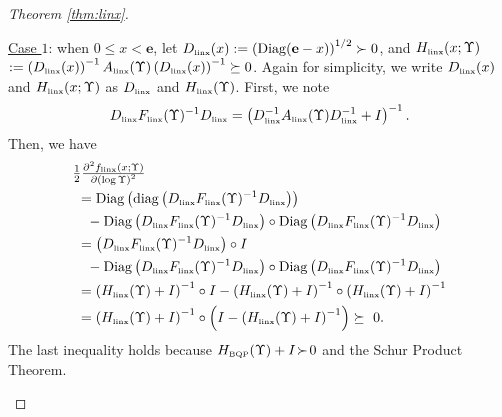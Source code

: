 \documentclass[smallextended]{svjour3hack}       %
\DeclareMathOperator{\Diag}{Diag}
\DeclareMathOperator{\diag}{diag}
\begin{document}
\begin{proof}[Theorem \ref{thm:linx}]
\begin{itemize}
    \smallskip
    \underline{Case $1$}: when $0\le x<\mathbf{e}$,  let $D_{{\tiny\mbox{linx}}}(x):=\left(\Diag(\mathbf{e}-x)\right)^{1/2} \succ 0$, and  $H_{{\tiny\mbox{linx}}}(x;\Upsilon)$ $:=\left(D_{{\tiny\mbox{linx}}}(x)\right)^{-1} A_{{\tiny\mbox{linx}}}(\Upsilon) \left(D_{{\tiny\mbox{linx}}}(x)\right)^{-1}\succeq 0$. Again for simplicity, we write $D_{{\tiny\mbox{linx}}}(x)$ and $H_{{\tiny\mbox{linx}}}(x;\Upsilon)$ as $D_{{\tiny\mbox{linx}}}$ and $H_{{\tiny\mbox{linx}}}(\Upsilon)$. First, we note
    \begin{align*}
        D_{{\tiny\mbox{linx}}}  F_{{\tiny\mbox{linx}}}(\Upsilon)^{-1}D_{{\tiny\mbox{linx}}} =\left( D_{{\tiny\mbox{linx}}}^{-1} A_{{\tiny\mbox{linx}}}(\Upsilon) D_{{\tiny\mbox{linx}}}^{-1} + I\right)^{-1}.
    \end{align*}
     Then, we have
    \begin{align*}
        & \textstyle\frac{1}{2} \frac{\partial^2 f_{{\tiny\mbox{linx}}}\left(x;\Upsilon\right)}{\partial \left(\log \Upsilon\right) ^2} \\
        &~= \Diag\left(\diag\left( D_{{\tiny\mbox{linx}}}  F_{{\tiny\mbox{linx}}}(\Upsilon)^{-1}D_{{\tiny\mbox{linx}}}\right)\right) \\
        & \quad -\Diag\left( D_{{\tiny\mbox{linx}}}  F_{{\tiny\mbox{linx}}}(\Upsilon)^{-1}D_{{\tiny\mbox{linx}}}\right) \circ \Diag\left( D_{{\tiny\mbox{linx}}}  F_{{\tiny\mbox{linx}}}(\Upsilon)^{-1}D_{{\tiny\mbox{linx}}}\right)\\
        & ~=\left( D_{{\tiny\mbox{linx}}}  F_{{\tiny\mbox{linx}}}(\Upsilon)^{-1}D_{{\tiny\mbox{linx}}}\right)\circ I \\
        & \quad -\Diag\left( D_{{\tiny\mbox{linx}}}  F_{{\tiny\mbox{linx}}}(\Upsilon)^{-1}D_{{\tiny\mbox{linx}}}\right) \circ \Diag\left( D_{{\tiny\mbox{linx}}}  F_{{\tiny\mbox{linx}}}(\Upsilon)^{-1}D_{{\tiny\mbox{linx}}}\right)\\
        & ~=\left(H_{{\tiny\mbox{linx}}}(\Upsilon)+I \right)^{-1}\circ I - \left(H_{{\tiny\mbox{linx}}}(\Upsilon)+I \right)^{-1} \circ \left(H_{{\tiny\mbox{linx}}}(\Upsilon)+I \right)^{-1}\\
        & ~=\left(H_{{\tiny\mbox{linx}}}(\Upsilon)+I \right)^{-1} \circ \left(I - \left(H_{{\tiny\mbox{linx}}}(\Upsilon)+I \right)^{-1} \right)
        \succeq  ~ 0.
    \end{align*}
    The last inequality holds because $H_{{\tiny\mbox{BQP}}}(\Upsilon)+I \! \succ\! 0$ and the Schur Product Theorem.


\end{itemize}
\end{proof}
\end{document}
